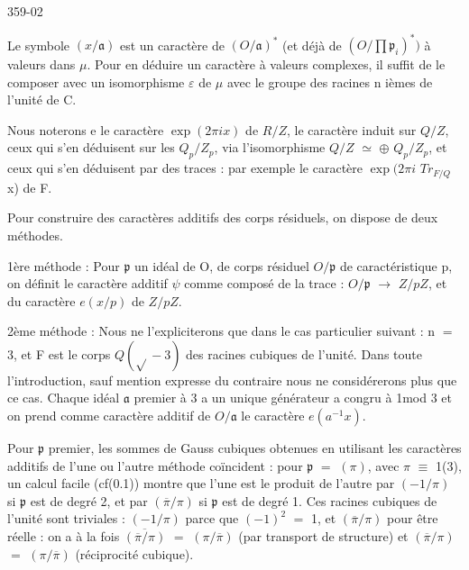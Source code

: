 \documentclass[10pt,a4paper]{article}
\begin{document}
\clearpage
{}
\label{d035-physical-002}
\par 359-02\par
\par Le symbole $(x/\mathfrak{a})$ est un caractère de $(O/\mathfrak{a})^*$ (et déjà de $(O/\prod{}\mathfrak{p}_i)^*)$ à valeurs dans $\mu{}$. Pour en déduire un caractère à valeurs complexes, il suffit de le composer avec un isomorphisme $\varepsilon{}$ de $\mu{}$ avec le groupe des racines n ièmes de l'unité de C.\par
\par Nous noterons e le caractère $\exp(2\pi{}ix)$ de $R/Z$, le caractère induit sur $Q/Z$, ceux qui s'en déduisent sur les $Q_p/Z_p$, via l'isomorphisme $Q/Z$ $\simeq{}$ $\oplus{}$ $Q_p/Z_p$, et ceux qui s'en déduisent par des traces : par exemple le caractère $\exp(2\pi{}i$ $Tr_{F/Q}$ x) de F.\par
\par Pour construire des caractères additifs des corps résiduels, on dispose de deux méthodes.\par
\par 1ère méthode : Pour $\mathfrak{p}$ un idéal de O, de corps résiduel $O/\mathfrak{p}$ de caractéristique p, on définit le caractère additif $\psi{}$ comme composé de la trace : $O/\mathfrak{p}$ $\to{}$ $Z/pZ$, et du caractère $e(x/p)$ de $Z/pZ$.\par
\par 2ème méthode : Nous ne l'expliciterons que dans le cas particulier suivant : n $=$ 3, et F est le corps $Q(\sqrt{}-3)$ des racines cubiques de l'unité. Dans toute l'introduction, sauf mention expresse du contraire nous ne considérerons plus que ce cas. Chaque idéal $\mathfrak{a}$ premier à 3 a un unique générateur a congru à 1mod 3 et on prend comme caractère additif de $O/\mathfrak{a}$ le caractère $e(a^{-1}x)$.\par
\par Pour $\mathfrak{p}$ premier, les sommes de Gauss cubiques obtenues en utilisant les caractères additifs de l'une ou l'autre méthode coïncident : pour $\mathfrak{p}$ $=$ $(\pi{})$, avec $\pi{}$ $\equiv{}$ 1(3), un calcul facile (cf(0.1)) montre que l'une est le produit de l'autre par $(-1/\pi{})$ si $\mathfrak{p}$ est de degré 2, et par $(\overline{\pi{}}/\pi{})$ si $\mathfrak{p}$ est de degré 1. Ces racines cubiques de l'unité sont triviales : $(-1/\pi{})$ parce que $(-1)^2$ $=$ 1, et $(\overline{\pi{}}/\pi{})$ pour être réelle : on a à la fois $\overline{(\overline{\pi{}}/\pi{})}$ $=$ $(\pi{}/\overline{\pi{}})$ (par transport de structure) et $(\overline{\pi{}}/\pi{})$ $=$ $(\pi{}/\overline{\pi{}})$ (réciprocité cubique).\par
\end{document}
